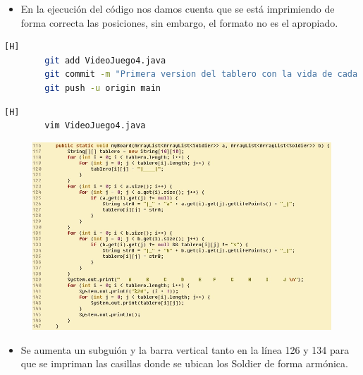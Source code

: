 \documentclass{article}
\begin{document}
	\begin{itemize}	
		\item En la ejecución del código nos damos cuenta que se está imprimiendo de forma correcta las posiciones, sin embargo, el formato no es el apropiado. 
	\end{itemize}
	
	\begin{lstlisting}[language=bash,caption={Commit: 44cebb1b28e0f5528952a1a7e67c71bd5f7a89b7 }][H]
		git add VideoJuego4.java
		git commit -m "Primera version del tablero con la vida de cada Soldier incluida"			
		git push -u origin main
	\end{lstlisting}
	
	
	
	\begin{lstlisting}[language=bash,caption={Se corrige el formato de impresión del tablero}][H]
		vim VideoJuego4.java
	\end{lstlisting}
	
	\begin{figure}[H]
		\centering
		\includegraphics[width=1\textwidth,keepaspectratio]{img/boardComplete.jpg}
	\end{figure}
	
	\begin{itemize}	
		\item Se aumenta un subguión y la barra vertical tanto en la línea 126 y 134 para que se impriman las casillas donde se ubican los Soldier de forma armónica.
	\end{itemize}
	
\end{document}
